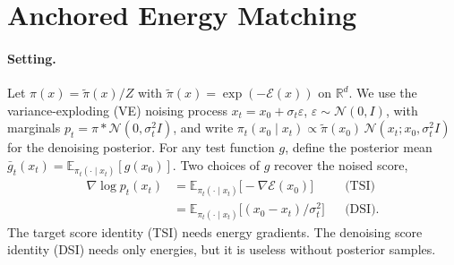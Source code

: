 \section{Anchored Energy Matching}
\label{sec:method}

\paragraph{Setting.}
Let $\pi(x)=\tilde\pi(x)/Z$ with $\tilde\pi(x)=\exp(-\mathcal{E}(x))$ on $\mathbb{R}^d$.
We use the variance-exploding (VE) noising process $x_t = x_0 + \sigma_t\varepsilon$, $\varepsilon\sim\mathcal{N}(0,I)$, with marginals $p_t=\pi*\mathcal{N}(0,\sigma_t^2 I)$, and write
$\pi_t(x_0\mid x_t)\propto \tilde\pi(x_0)\,\mathcal{N}(x_t;x_0,\sigma_t^2I)$ for the denoising posterior.
For any test function $g$, define the posterior mean $\bar g_t(x_t)=\mathbb{E}_{\pi_t(\cdot\mid x_t)}[g(x_0)]$.
Two choices of $g$ recover the noised score,
\begin{align}
\nabla\log p_t(x_t)
&= \mathbb{E}_{\pi_t(\cdot\mid x_t)}\big[-\nabla\mathcal{E}(x_0)\big] && \text{(TSI)}\label{eq:tsi}\\
&= \mathbb{E}_{\pi_t(\cdot\mid x_t)}\big[(x_0-x_t)/\sigma_t^2\big] && \text{(DSI)}.\label{eq:dsi}
\end{align}
The target score identity (TSI) needs energy gradients. The denoising score identity (DSI) needs only energies, but it is useless without posterior samples.


